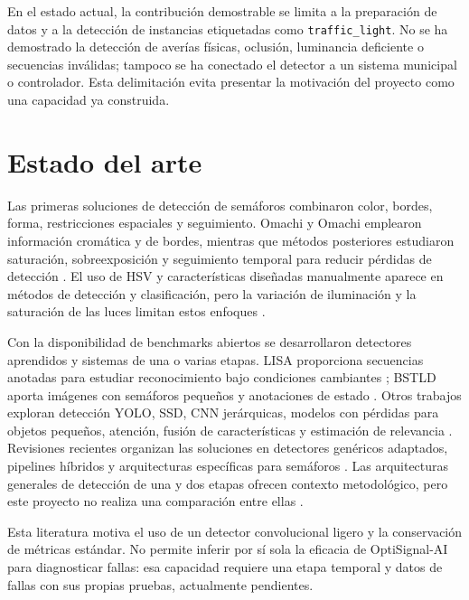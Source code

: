 \documentclass[conference]{IEEEtran}
\begin{document}
En el estado actual, la contribución demostrable se limita a la preparación de datos y a la detección de instancias etiquetadas como \texttt{traffic\_light}. No se ha demostrado la detección de averías físicas, oclusión, luminancia deficiente o secuencias inválidas; tampoco se ha conectado el detector a un sistema municipal o controlador. Esta delimitación evita presentar la motivación del proyecto como una capacidad ya construida.

\section{Estado del arte}
Las primeras soluciones de detección de semáforos combinaron color, bordes, forma, restricciones espaciales y seguimiento. Omachi y Omachi emplearon información cromática y de bordes, mientras que métodos posteriores estudiaron saturación, sobreexposición y seguimiento temporal para reducir pérdidas de detección \cite{omachi2009,moizumi2016,gong2010,john2014,john2015}. El uso de HSV y características diseñadas manualmente aparece en métodos de detección y clasificación, pero la variación de iluminación y la saturación de las luces limitan estos enfoques \cite{zhang2015,gao2020}.

Con la disponibilidad de benchmarks abiertos se desarrollaron detectores aprendidos y sistemas de una o varias etapas. LISA proporciona secuencias anotadas para estudiar reconocimiento bajo condiciones cambiantes \cite{jensen2016,philipsen2015}; BSTLD aporta imágenes con semáforos pequeños y anotaciones de estado \cite{behrendt2017,bstlddataset}. Otros trabajos exploran detección YOLO, SSD, CNN jerárquicas, modelos con pérdidas para objetos pequeños, atención, fusión de características y estimación de relevancia \cite{jensen2017,behrendt2017,muller2018,weber2016,weber2018,lee2019,possatti2019,wang2021,chuang2023,wang2023,lee2024,trinci2026}. Revisiones recientes organizan las soluciones en detectores genéricos adaptados, pipelines híbridos y arquitecturas específicas para semáforos \cite{pavlitska2023,sarker2024}. Las arquitecturas generales de detección de una y dos etapas ofrecen contexto metodológico, pero este proyecto no realiza una comparación entre ellas \cite{redmon2016,liu2016,ren2015,lin2017,huang2017}.

Esta literatura motiva el uso de un detector convolucional ligero y la conservación de métricas estándar. No permite inferir por sí sola la eficacia de OptiSignal-AI para diagnosticar fallas: esa capacidad requiere una etapa temporal y datos de fallas con sus propias pruebas, actualmente pendientes.
\end{document}
